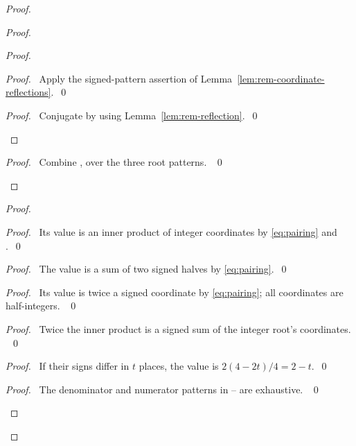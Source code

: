 \begin{proof}
\begin{proof}
\begin{proof}
\begin{proof}\pf\ Apply the signed-pattern assertion of
Lemma~\ref{lem:rem-coordinate-reflections}.~\qed\end{proof}
\qedstep
\begin{proof}\pf\ Conjugate  by 
using Lemma~\ref{lem:rem-reflection}.~\qed\end{proof}
\end{proof}
\qedstep
\begin{proof}\pf\ Combine , 
over the three root patterns. ~\qed\end{proof}
\end{proof}
\begin{proof}
\begin{proof}\pf\ Its value is an inner product of integer coordinates
by \eqref{eq:pairing} and .~\qed\end{proof}
\begin{proof}\pf\ The value is a sum of two signed halves by \eqref{eq:pairing}.~\qed\end{proof}
\begin{proof}\pf\ Its value is twice a signed coordinate by
\eqref{eq:pairing}; all coordinates are half-integers. ~\qed\end{proof}
\begin{proof}\pf\ Twice the inner product is a signed sum of the
integer root's coordinates. ~\qed\end{proof}
\begin{proof}\pf\ If their signs differ in $t$ places, the value is
$2(4-2t)/4=2-t$.~\qed\end{proof}
\qedstep
\begin{proof}\pf\ The denominator and numerator patterns in
-- are exhaustive. ~\qed\end{proof}
\end{proof}

\end{proof}
